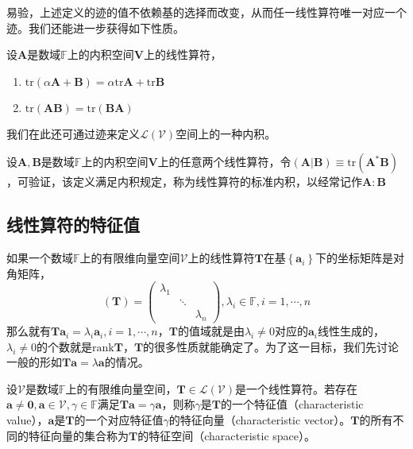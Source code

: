 \documentclass[main.tex]{subfiles}
\begin{document}
易验，上述定义的迹的值不依赖基的选择而改变，从而任一线性算符唯一对应一个迹。我们还能进一步获得如下性质。

\begin{theorem}
设$\mathbf{A}$是数域$\mathbb{F}$上的内积空间$\mathbf{V}$上的线性算符，
\begin{enumerate}
    \item $\mathrm{tr}\left(\alpha\mathbf{A}+\mathbf{B}\right)=\alpha\mathrm{tr}\mathbf{A}+\mathrm{tr}\mathbf{B}$
    \item $\mathrm{tr}\left(\mathbf{AB}\right)=\mathrm{tr}\left(\mathbf{BA}\right)$
\end{enumerate}
\end{theorem}

我们在此还可通过迹来定义$\mathcal{L}\left(\mathcal{V}\right)$空间上的一种内积。

\begin{definition}[线性算符的标准内积]
设$\mathbf{A},\mathbf{B}$是数域$\mathbb{F}$上的内积空间$\mathbf{V}$上的任意两个线性算符，令$\left(\mathbf{A}|\mathbf{B}\right)\equiv\mathrm{tr}\left(\mathbf{A}^*\mathbf{B}\right)$，可验证，该定义满足内积规定，称为线性算符的标准内积，以经常记作$\mathbf{A}:\mathbf{B}$
\end{definition}

\subsection{线性算符的特征值}
如果一个数域$\mathbb{F}$上的有限维向量空间$\mathcal{V}$上的线性算符$\mathbf{T}$在基$\left\{\mathbf{a}_i\right\}$下的坐标矩阵是对角矩阵，
\[\left(\mathbf{T}\right)=\left(\begin{array}{ccc}\lambda_1&&\\&\ddots&\\&&\lambda_n\end{array}\right),\lambda_i\in\mathbb{F},i=1,\cdots,n\]
那么就有$\mathbf{Ta}_i=\lambda_i \mathbf{a}_i,i=1,\cdots,n$，$\mathbf{T}$的值域就是由$\lambda_i\neq 0$对应的$\mathbf{a}_i$线性生成的，$\lambda_i\neq 0$的个数就是$\mathrm{rank}\mathbf{T}$，$\mathbf{T}$的很多性质就能确定了。为了这一目标，我们先讨论一般的形如$\mathbf{Ta}=\lambda\mathbf{a}$的情况。

\begin{definition}
设$\mathcal{V}$是数域$\mathbb{F}$上的有限维向量空间，$\mathbf{T}\in\mathcal{L}\left(\mathcal{V}\right)$是一个线性算符。若存在$\mathbf{a}\neq\mathbf{0},\mathbf{a}\in\mathcal{V},\gamma\in\mathbb{F}$满足$\mathbf{Ta}=\gamma\mathbf{a}$，则称$\gamma$是$\mathbf{T}$的一个特征值（characteristic value），$\mathbf{a}$是$\mathbf{T}$的一个对应特征值$\gamma$的特征向量（characteristic vector）。$\mathbf{T}$的所有不同的特征向量的集合称为$\mathbf{T}$的特征空间（characteristic space）。
\end{definition}
\end{document}
